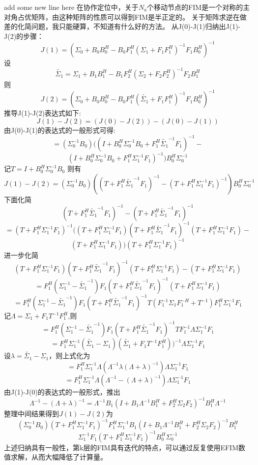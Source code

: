 \documentclass[12pt]{article}
\begin{document}
\title{\textbf{}} 

\author{}
\maketitle
\large
add some new line here
在协作定位中，关于$N_a$个移动节点的FIM是一个对称的主对角占优矩阵，由这种矩阵的性质可以得到FIM是半正定的。
关于矩阵求逆在做差的化简问题，我只能硬算，不知道有什么好的方法。
从J(0)-J(1)归纳出J(1)-J(2)的步骤：
\[
J(1)=(\Sigma_0+B_0B_0^H-B_0F_1^H
(\Sigma_1+F_1F_1^H)^{-1}F_1B_0^H)^{-1}
\]
设
\[
\tilde{\Sigma_1}=\Sigma_1+B_1B_1^H-B_1F_2^H
(\Sigma_2+F_2F_2^H)^{-1}F_2B_1^H
\]
则
\[
J(2)=(\Sigma_0+B_0B_0^H-B_0F_1^H
(\tilde{\Sigma_1}+F_1F_1^H)^{-1}F_1B_0^H)^{-1}
\]
推导J(1)-J(2)表达式如下:
\[
J(1)-J(2)=(J(0)-J(2))-(J(0)-J(1))
\]
由J(0)-J(1)的表达式的一般形式可得:
\[
=(\Sigma_0^{-1}B_0)((I+B_0^H\Sigma_0^{-1}B_0+F_1^H\tilde{\Sigma_1}^{-1}F_1)^{-1}-
\]
\[
(I+B_0^H\Sigma_0^{-1}B_0+F_1^H\Sigma_1^{-1}F_1)^{-1})B_0^H\Sigma_0^{-1}
\]
记$T=I+B_0^H\Sigma_0^{-1}B_0$
则有
\[
J(1)-J(2)=(\Sigma_0^{-1}B_0)((T+F_1^H\tilde{\Sigma_1}^{-1}F_1)^{-1}-(T+F_1^H\Sigma_1^{-1}F_1)^{-1})B_0^H\Sigma_0^{-1}
\]
下面化简
\[
(T+F_1^H\tilde{\Sigma_1}^{-1}F_1)^{-1}-(T+F_1^H\tilde{\Sigma_1}^{-1}F_1)^{-1}
\]
\[
=(T+F_1^H\Sigma_1^{-1}F_1)^{-1}((T+F_1^H\Sigma_1^{-1}F_1)(T+F_1^H\tilde{\Sigma_1}^{-1}F_1)^{-1}
(T+F_1^H\Sigma_1^{-1}F_1)-
\]
\[
(T+F_1^H\Sigma_1^{-1}F_1))(T+F_1^H\Sigma_1^{-1}F_1)^{-1}
\]
进一步化简
\[
(T+F_1^H\Sigma_1^{-1}F_1)(T+F_1^H\tilde{\Sigma_1}^{-1}F_1)^{-1}
(T+F_1^H\Sigma_1^{-1}F_1)-(T+F_1^H\Sigma_1^{-1}F_1)
\]
\[
=F_1^H(\Sigma_1^{-1}-\tilde{\Sigma_1}^{-1})F_1(T+F_1^H\tilde{\Sigma_1}^{-1}F_1)^{-1}(T+F_1^H\Sigma_1^{-1}F_1)
\]
\[
=F_1^H(\Sigma_1^{-1}-\tilde{\Sigma_1}^{-1})F_1(T+F_1^H\tilde{\Sigma_1}^{-1}F_1)^{-1}T(F_1^{-1}\Sigma_1F_1^{-H}+T^{-1})F_1^H\Sigma_1^{-1}F_1
\]
记$\Lambda=\Sigma_1+F_1T^{-1}F_1^H$,则
\[
=F_1^H(\Sigma_1^{-1}-\tilde{\Sigma_1}^{-1})F_1(T+F_1^H\tilde{\Sigma_1}^{-1}F_1)^{-1}TF_1^{-1}\Lambda\Sigma_1^{-1}F_1
\]
\[
=F_1^H\Sigma_1^{-1}(\tilde{\Sigma_1}-\Sigma_1)(\tilde{\Sigma_1}+F_1T^{-1}F_1^H))^{-1}\Lambda\Sigma_1^{-1}F_1
\]
设$\lambda=\tilde{\Sigma_1}-\Sigma_1$，则上式化为
\[
=F_1^H\Sigma_1^{-1}\Lambda(\Lambda^{-1}\lambda(\Lambda+\lambda)^{-1})\Lambda\Sigma_1^{-1}F_1
\]
\[
=F_1^H\Sigma_1^{-1}\Lambda(\Lambda^{-1}-(\Lambda+\lambda)^{-1})\Lambda\Sigma_1^{-1}F_1
\]
由J(1)-J(0)的表达式的一般形式，推出
\[
\Lambda^{-1}-(\Lambda+\lambda)^{-1}=\Lambda^{-1}B_1(I+B_1\Lambda^{-1}B_1^H+F_2^H\Sigma_2F_2)^{-1}B_1^H\Lambda^{-1}
\]
整理中间结果得到$J(1)-J(2)$为
\[
(\Sigma_0^{-1}B_0)(T+F_1^H\Sigma_1^{-1}F_1)^{-1}F_1^H\Sigma_1^{-1}B_1(I+B_1\Lambda^{-1}B_1^H+F_2^H\Sigma_2F_2)^{-1}B_1^H
\]
\[
\Sigma_1^{-1}F_1(T+F_1^H\Sigma_1^{-1}F_1)^{-1}B_0^H\Sigma_0^{-1}
\]
上述归纳具有一般性，第k层的FIM具有迭代的特点，可以通过反复使用EFIM数值求解，从而大幅降低了计算量。
\end{document}
